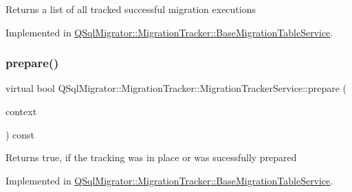 \begin{DoxyReturn}{Returns}
a list of all tracked successful migration executions 
\end{DoxyReturn}


Implemented in \hyperlink{class_q_sql_migrator_1_1_migration_tracker_1_1_base_migration_table_service_a1105240b456db9f85c2fc2866582a292}{Q\+Sql\+Migrator\+::\+Migration\+Tracker\+::\+Base\+Migration\+Table\+Service}.

\mbox{\label{class_q_sql_migrator_1_1_migration_tracker_1_1_migration_tracker_service_a26dc17b23f3e2a62c9964ce46c740b57}} 
\subsubsection{\texorpdfstring{prepare()}{prepare()}}
{\footnotesize\ttfamily virtual bool Q\+Sql\+Migrator\+::\+Migration\+Tracker\+::\+Migration\+Tracker\+Service\+::prepare (\begin{DoxyParamCaption}\item[{const \hyperlink{class_q_sql_migrator_1_1_migration_execution_1_1_migration_execution_context}{Migration\+Execution\+::\+Migration\+Execution\+Context} \&}]{context }\end{DoxyParamCaption}) const\hspace{0.3cm}{\ttfamily [pure virtual]}}

\begin{DoxyReturn}{Returns}
true, if the tracking was in place or was sucessfully prepared 
\end{DoxyReturn}


Implemented in \hyperlink{class_q_sql_migrator_1_1_migration_tracker_1_1_base_migration_table_service_a76bec328f72c8fc91002cc285731332c}{Q\+Sql\+Migrator\+::\+Migration\+Tracker\+::\+Base\+Migration\+Table\+Service}.

\mbox{\label{class_q_sql_migrator_1_1_migration_tracker_1_1_migration_tracker_service_a3041c2cb0027e6a40639ce4c47482c17}} 
